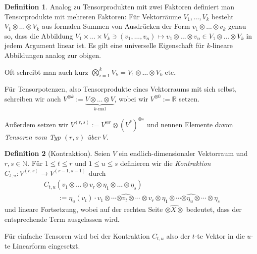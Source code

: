 \documentclass[a4paper]{scrreprt}
\numberwithin{equation}{chapter}
\theoremstyle{definition}
\newtheorem{defn}{Definition}[section]
\begin{document}
\begin{defn}
	Analog zu Tensorprodukten mit zwei Faktoren definiert man Tensorprodukte mit mehreren Faktoren: Für Vektorräume $V_1, \dots, V_k$ besteht $V_1 \otimes \dots \otimes V_k$ aus formalen Summen von Ausdrücken der Form $v_1 \otimes \dots \otimes v_k$ genau so, dass die Abbildung $V_1 \times \dots \times V_k \ni (v_1,\dots,v_n) \mapsto v_1 \otimes \dots \otimes v_n \in V_1 \otimes \dots \otimes V_k$ in jedem Argument linear ist. Es gilt eine universelle Eigenschaft für $k$-lineare Abbildungen analog zur obigen.

	Oft schreibt man auch kurz $\bigotimes_{i=1}^k V_k = V_1 \otimes \dots \otimes V_k$ etc.

	Für \glqq Tensorpotenzen\grqq, also Tensorprodukte eines Vektorraums mit sich selbst, schreiben wir auch $V^{\otimes k} := \underbrace{V \otimes \dots \otimes V}_\text{$k$-mal}$, wobei wir $V^{\otimes 0} := \mathbb R$ setzen.

	Außerdem setzen wir $V^{(r,s)} := V^{\otimes r} \otimes (V^*)^{\otimes s}$ und nennen Elemente davon \emph{Tensoren vom Typ $(r,s)$ über $V$}.
\end{defn}
\begin{defn}[Kontraktion]
	Seien $V$ ein endlich-dimensionaler Vektorraum und $r,s \in \mathbb N$. Für $1 \le t \le r$ und $1 \le u \le s$ definieren wir die \emph{Kontraktion} $C_{t,u} \colon V^{(r,s)} \to V^{(r-1,s-1)}$ durch
	\begin{align*}
	&C_{t,u}(v_1 \otimes \dots \otimes v_r \otimes \eta_1 \otimes \dots \otimes \eta_s) \\& \qquad := \eta_u(v_t) \cdot v_1 \otimes \cdots \widehat{\otimes v_t \otimes} \cdots \otimes v_r \otimes \eta_1 \otimes \cdots \widehat{\otimes \eta_u \otimes} \cdots \otimes \eta_s
	\end{align*}
	und lineare Fortsetzung, wobei auf der rechten Seite $\widehat{\otimes X \otimes}$ bedeutet, dass der entsprechende Term ausgelassen wird.
	
	Für einfache Tensoren wird bei der Kontraktion $C_{t,u}$ also der $t$-te Vektor in die $u$-te Linearform eingesetzt.
\end{defn}
\end{document}
